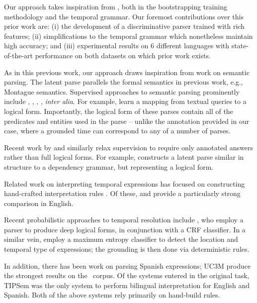 Our approach takes inspiration from \me, both in the bootstrapping training
  methodology and the temporal grammar.
Our foremost contributions over this prior work are:
  (i) the development of a discriminative parser trained with rich features;
  (ii) simplifications to the temporal grammar which nonetheless maintain
       high accuracy;
  and
  (iii) experimental results on 6 different languages with state-of-the-art
        performance on both datasets on which prior work exists.

As in this previous work,
  our approach draws inspiration from work on semantic parsing.
The latent parse parallels the formal semantics in previous work,
	e.g., Montague semantics.
Supervised approaches to semantic parsing prominently include
	,
	,
	, 
	, 
	\textit{inter alia}.
For example,  learn a mapping from
	textual queries to a logical form.
Importantly, the logical form of these parses contain all of the predicates
  and entities used in the parse -- unlike the annotation provided in our case,
  where a grounded time can correspond to any of a number of parses.

Recent work by  and 
	 similarly relax supervision 
	to require only annotated answers rather than full logical forms.
For example,  constructs a latent parse
	similar in structure to a dependency grammar, but representing a logical
	form.

Related work on interpreting temporal expressions has focused on constructing
	hand-crafted interpretation rules
	\cite{key:2000mani-temporal,key:2003saquete-temporal,key:2004puscasu-temporal,key:2010grover-temporal}.  
Of these,  \cite{key:2010strotgen-temporal} and
	 \cite{key:2012chang-temporal} provide a particularly strong
	comparison in English.

Recent probabilistic approaches to temporal resolution include
	,    %
	who employ a parser to produce deep logical forms, in conjunction with
	a CRF classifier.
In a similar vein,
	employ a maximum entropy classifier to detect the location and temporal
	type of expressions; the grounding is then done via deterministic rules.
	
In addition, there has been work on parsing Spanish expressions;
  UC3M \cite{2010vicente-uc3m} produce the strongest results on the
  \tempeval\ corpus.
Of the systems entered in the original task,
  TIPSem \cite{key:2010llorens-tipsem} was the only system to perform bilingual
  interpretation for English and Spanish.
Both of the above systems rely primarily on hand-build rules.



